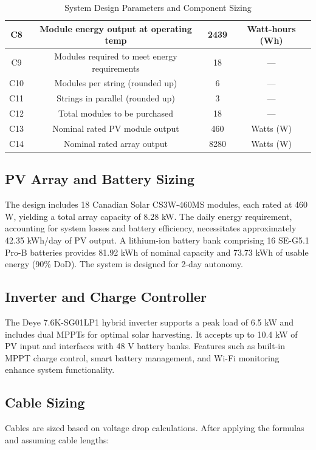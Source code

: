\documentclass{article}
\begin{document}
\begin{table}[H]
\begin{tabular}{|c|c|c|c|}
\hline
C8 & Module energy output at operating temp & 2439 & Watt-hours (Wh) \\
\hline
C9 & Modules required to meet energy requirements & 18 & --- \\
\hline
C10 & Modules per string (rounded up) & 6 & --- \\
\hline
C11 & Strings in parallel (rounded up) & 3 & --- \\
\hline
C12 & Total modules to be purchased & 18 & --- \\
\hline
C13 & Nominal rated PV module output & 460 & Watts (W) \\
\hline
C14 & Nominal rated array output & 8280 & Watts (W) \\
\hline
\end{tabular}
\caption{System Design Parameters and Component Sizing}
\label{tab:placeholder}
\end{table}
\newpage
\subsection{PV Array and Battery Sizing}
The design includes 18 Canadian Solar CS3W-460MS modules, each rated at 460 W, yielding a total array capacity of 8.28 kW. The daily energy requirement, accounting for system losses and battery efficiency, necessitates approximately 42.35 kWh/day of PV output. A lithium-ion battery bank comprising 16 SE-G5.1 Pro-B batteries provides 81.92 kWh of nominal capacity and 73.73 kWh of usable energy (90\% DoD). The system is designed for 2-day autonomy.

\subsection{Inverter and Charge Controller}
The Deye 7.6K-SG01LP1 hybrid inverter supports a peak load of 6.5 kW and includes dual MPPTs for optimal solar harvesting. It accepts up to 10.4 kW of PV input and interfaces with 48 V battery banks. Features such as built-in MPPT charge control, smart battery management, and Wi-Fi monitoring enhance system functionality.

\subsection{Cable Sizing}
Cables are sized based on voltage drop calculations. After applying the formulas and assuming cable lengths:
\end{document}
